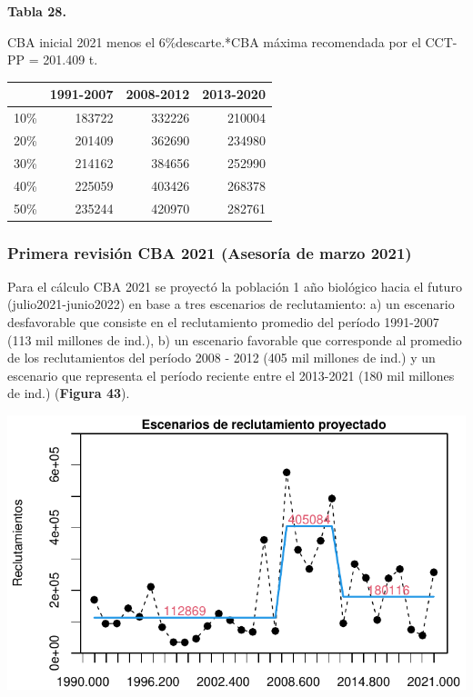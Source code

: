 \documentclass[
  spanish,
]{article}
\begin{document}
\vspace{-0.5cm}

\small
\begin{center} 
\textbf{Tabla 28.}
\end{center}
\begin{center} 
\vspace{-0.2cm} CBA inicial 2021 menos el 6\%descarte.*CBA máxima recomendada por el CCT-PP = 201.409 t.
\end{center}
\vspace{-0.2cm}

\begin{longtable}[]{@{}lrrr@{}}
\toprule
& 1991-2007 & 2008-2012 & 2013-2020\tabularnewline
\midrule
\endhead
10\% & 183722 & 332226 & 210004\tabularnewline
20\% & 201409 & 362690 & 234980\tabularnewline
30\% & 214162 & 384656 & 252990\tabularnewline
40\% & 225059 & 403426 & 268378\tabularnewline
50\% & 235244 & 420970 & 282761\tabularnewline
\bottomrule
\end{longtable}

\normalsize

\pagebreak

\hypertarget{primera-revisiuxf3n-cba-2021-asesoruxeda-de-marzo-2021}{%
\subsubsection{Primera revisión CBA 2021 (Asesoría de marzo
2021)}\label{primera-revisiuxf3n-cba-2021-asesoruxeda-de-marzo-2021}}

Para el cálculo CBA 2021 se proyectó la población 1 año biológico hacia
el futuro (julio2021-junio2022) en base a tres escenarios de
reclutamiento: a) un escenario desfavorable que consiste en el
reclutamiento promedio del período 1991-2007 (113 mil millones de ind.),
b) un escenario favorable que corresponde al promedio de los
reclutamientos del período 2008 - 2012 (405 mil millones de ind.) y un
escenario que representa el período reciente entre el 2013-2021 (180 mil
millones de ind.) (\textbf{Figura 43}).

\vspace{0.5cm}

\begin{center}\includegraphics{FigurasInforme_Marzo/Fig43_Reclproy_marzo-1} \end{center}
\end{document}
